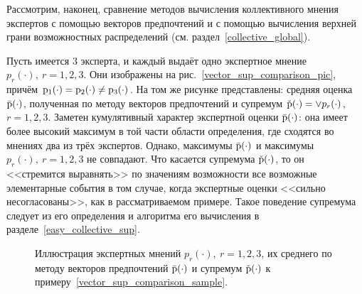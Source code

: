 Рассмотрим, наконец, сравнение методов вычисления коллективного мнения экспертов с помощью векторов предпочтений и с помощью вычисления верхней грани возможностных распределений (см. раздел~\ref{collective_global}).
\begin{example}
\label{vector_sup_comparison_sample}
Пусть имеется $3$ эксперта, и каждый выдаёт одно экспертное мнение $p_r(\cdot),\ r=1,2,3$. Они изображены на рис.~\ref{vector_sup_comparison_pic}, причём ${\mathrm{p}}_1(\cdot) = {\mathrm{p}}_2(\cdot) \neq {\mathrm{p}}_3(\cdot)$. На том же рисунке представлены: средняя оценка $\bar{{\mathrm{p}}}(\cdot)$, полученная по методу векторов предпочтений и супремум $\check{{\mathrm{p}}}(\cdot) = \vee p_r(\cdot)$, $r=1,2,3$. Заметен кумулятивный характер экспертной оценки $\bar{{\mathrm{p}}}(\cdot)$: она имеет более высокий максимум в той части области определения, где сходятся во мнениях два из трёх экспертов. Однако, максимумы $\bar{{\mathrm{p}}}(\cdot)$ и максимумы $p_r(\cdot),\ r=1,2,3$ не совпадают. Что касается супремума $\check{{\mathrm{p}}}(\cdot)$, то он <<стремится выравнять>> по значениям возможности все возможные элементарные события в том случае, когда экспертные оценки <<сильно несогласованы>>, как в рассматриваемом примере. Такое поведение супремума следует из его определения и алгоритма его вычисления в разделе~\ref{easy_collective_sup}.  
\end{example}

\begin{figure}[h]
\caption{\small Иллюстрация экспертных мнений $p_r(\cdot),\ r=1,2,3$, их среднего по методу векторов предпочтений $\bar{{\mathrm{p}}}(\cdot)$ и супремум $\check{{\mathrm{p}}}(\cdot)$ к примеру~\ref{vector_sup_comparison_sample}.}
\label{ris:expert_sample}
\end{figure}



